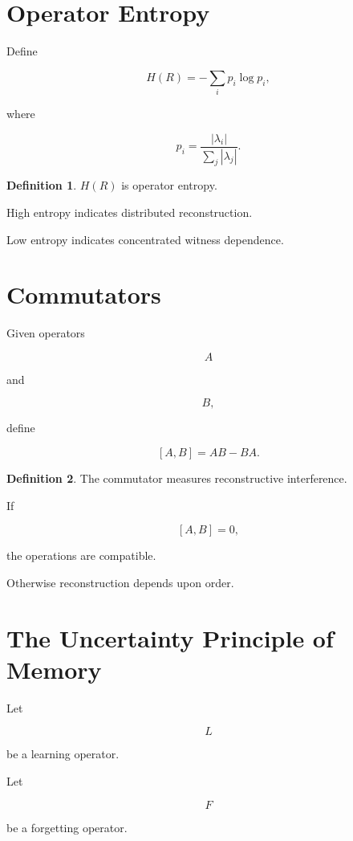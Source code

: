 \documentclass[12pt,oneside]{book}
\theoremstyle{plain} \newtheorem{theorem}{Theorem}[chapter] \newtheorem{lemma}[theorem]{Lemma} \newtheorem{proposition}[theorem]{Proposition} \newtheorem{corollary}[theorem]{Corollary}
\theoremstyle{definition} \newtheorem{definition}[theorem]{Definition} \newtheorem{axiom}[theorem]{Axiom} \newtheorem{construction}[theorem]{Construction}
\theoremstyle{remark} \newtheorem{remark}[theorem]{Remark} \newtheorem{example}[theorem]{Example}
\begin{document}
\section{Operator Entropy}

Define

\[
H(R)
=
-\sum_i
p_i
\log p_i,
\]

where

\[
p_i
=
\frac{|\lambda_i|}
{\sum_j |\lambda_j|}.
\]

\begin{definition}

$H(R)$ is operator entropy.

\end{definition}

High entropy indicates distributed reconstruction.

Low entropy indicates concentrated witness dependence.

\section{Commutators}

Given operators

\[
A
\]

and

\[
B,
\]

define

\[
[A,B]
=
AB-BA.
\]

\begin{definition}

The commutator measures reconstructive interference.

\end{definition}

If

\[
[A,B]
=
0,
\]

the operations are compatible.

Otherwise reconstruction depends upon order.

\section{The Uncertainty Principle of Memory}

Let

\[
L
\]

be a learning operator.

Let

\[
F
\]

be a forgetting operator.
\end{document}
